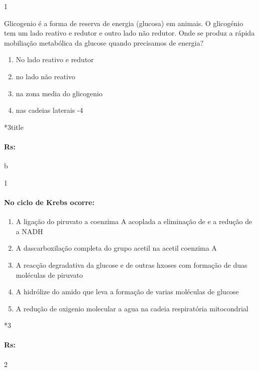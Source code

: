 \documentclass[\mainfilename]{subfiles}
\begin{document}
\setcounter{question}{32}
\begin{questionBox}1{}
    
    Glicogenio é a forma de reserva de energia (glucosa) em animais. O glicogénio tem um lado reativo e redutor e outro lado não redutor. Onde se produz a rápida mobiliação metabólica da glucose quando precisamos de energia?

    \begin{enumerate}[label={(\alph*)}]
        \item No lado reativo e redutor
        \item no lado não reativo
        \item na zona media do glicogenio
        \item nas cadeias laterais -4
    \end{enumerate}

    \begin{questionBox}*3{title}
        
        \paragraph{Rs:} b
        
    \end{questionBox}
    
\end{questionBox}

\begin{questionBox}1{}
    
    \paragraph{No ciclo de Krebs ocorre:}
    \begin{enumerate}
        \item A ligação do piruvato a coenzima A acoplada a eliminação de  e a redução de  a NADH
        \item A dascarboxilação completa do grupo acetil na acetil coenzima A
        \item A reacção degradativa da glucose e de outras hxoses com formação de duas moléculas de piruvato
        \item A hidrólize do amido que leva a formação de varias moléculas de glucose
        \item A redução de oxigenio molecular a agua na cadeia respiratória mitocondrial
    \end{enumerate}

    \begin{questionBox}*3{}
        
        \paragraph{Rs:} 2
        
    \end{questionBox}
    
\end{questionBox}
\end{document}
